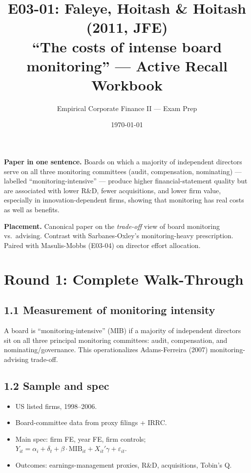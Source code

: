 \documentclass[11pt]{article}
\title{E03-01: Faleye, Hoitash \& Hoitash (2011, JFE) \\
\large ``The costs of intense board monitoring'' --- Active Recall Workbook}
\author{Empirical Corporate Finance II --- Exam Prep}
\date{\today}
\begin{document}
\maketitle

\begin{keybox}
\textbf{Paper in one sentence.} Boards on which a majority of independent directors serve on all three monitoring committees (audit, compensation, nominating) --- labelled ``monitoring-intensive'' --- produce higher financial-statement quality but are associated with lower R\&D, fewer acquisitions, and lower firm value, especially in innovation-dependent firms, showing that monitoring has real costs as well as benefits.

\textbf{Placement.} Canonical paper on the \emph{trade-off} view of board monitoring vs.\ advising. Contrast with Sarbanes-Oxley's monitoring-heavy prescription. Paired with Masulis-Mobbs (E03-04) on director effort allocation.
\end{keybox}

\section*{Round 1: Complete Walk-Through}

\subsection*{1.1 Measurement of monitoring intensity}
A board is ``monitoring-intensive'' (MIB) if a majority of independent directors sit on all three principal monitoring committees: audit, compensation, and nominating/governance. This operationalizes Adams-Ferreira (2007) monitoring-advising trade-off.

\subsection*{1.2 Sample and spec}
\begin{itemize}
\item US listed firms, 1998--2006.
\item Board-committee data from proxy filings + IRRC.
\item Main spec: firm FE, year FE, firm controls; $Y_{it}=\alpha_i+\delta_t+\beta\cdot \text{MIB}_{it}+X_{it}'\gamma+\varepsilon_{it}$.
\item Outcomes: earnings-management proxies, R\&D, acquisitions, Tobin's Q.
\end{itemize}
\end{document}
